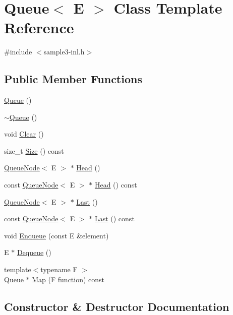 \hypertarget{class_queue}{}\section{Queue$<$ E $>$ Class Template Reference}
\label{class_queue}


{\ttfamily \#include $<$sample3-\/inl.\+h$>$}

\subsection*{Public Member Functions}
\begin{DoxyCompactItemize}
\item 
\hyperlink{class_queue_ab09891e54b51dc677ee6efb350687ae4}{Queue} ()
\item 
\hyperlink{class_queue_a49fe82adb8dc2fb62ab53876a6933d0f}{$\sim$\+Queue} ()
\item 
void \hyperlink{class_queue_acfdd5f9f7e936ca30dcf877370ef9510}{Clear} ()
\item 
size\+\_\+t \hyperlink{class_queue_a8d69a34b2dfccbf1343b7fc4ba35da90}{Size} () const 
\item 
\hyperlink{class_queue_node}{Queue\+Node}$<$ E $>$ $\ast$ \hyperlink{class_queue_a71aa0154ef75bb87a53b6af1829fcd5e}{Head} ()
\item 
const \hyperlink{class_queue_node}{Queue\+Node}$<$ E $>$ $\ast$ \hyperlink{class_queue_a877051b27c1c844ab5d5455116a54e57}{Head} () const 
\item 
\hyperlink{class_queue_node}{Queue\+Node}$<$ E $>$ $\ast$ \hyperlink{class_queue_a430aca3d3b9f5fd588b215028d134b74}{Last} ()
\item 
const \hyperlink{class_queue_node}{Queue\+Node}$<$ E $>$ $\ast$ \hyperlink{class_queue_a9b162059e84011b0088b22fc6dc8d188}{Last} () const 
\item 
void \hyperlink{class_queue_abaa2e7175457307bca74f5562cbdaaa9}{Enqueue} (const E \&element)
\item 
E $\ast$ \hyperlink{class_queue_a434d465001c3078e999f7a89a8af84c0}{Dequeue} ()
\item 
{\footnotesize template$<$typename F $>$ }\\\hyperlink{class_queue}{Queue} $\ast$ \hyperlink{class_queue_a7cb2f6585319ba1fd19d2347d95e71c1}{Map} (F \hyperlink{_07copy_08_2_undistort_image_8m_aa0b19300b507d475ab9f1525750bc11f}{function}) const 
\end{DoxyCompactItemize}


\subsection{Constructor \& Destructor Documentation}

